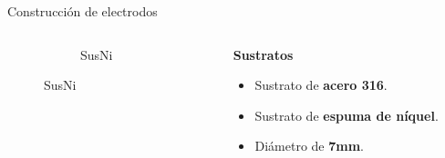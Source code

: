 \documentclass[aspectratio=169]{beamer}
\newcommand{\mSustratoNiquel}{SusNi }
\begin{document}
\begin{frame}{Construcción de electrodos}
\begin{columns}
\begin{column}{0.3\textwidth}
\begin{figure}
{\begin{subfigure}[b]{\electrodesWidth}
						\caption{\mSustratoNiquel}
					\end{subfigure}}
				\end{figure}
			\end{column}
			\begin{column}{0.6\textwidth}
				\textbf{Sustratos}
				\begin{itemize}[<+(1)->]
					\item Sustrato de \textbf{acero 316}.
					\item Sustrato de \textbf{espuma de níquel}.
					\item Diámetro de \textbf{7mm}.
				\end{itemize}
			\end{column}
		\end{columns}		
	\end{frame}
\end{document}
